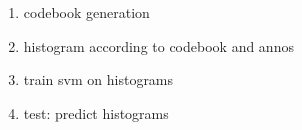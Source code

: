 

\begin{enumerate}
  \item codebook generation
  \item histogram according to codebook and annos
  \item train svm on histograms
  \item test: predict histograms
\end{enumerate}

